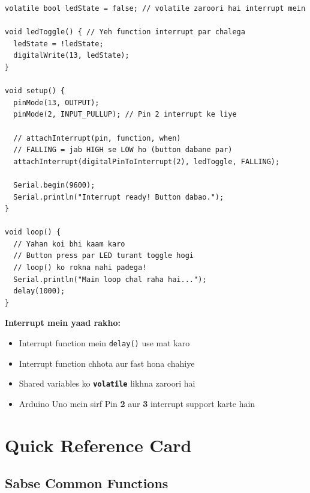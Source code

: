 \documentclass[12pt,a4paper]{article}
\newcommand{\keyword}[1]{\textcolor{keywordColor}{\texttt{\textbf{#1}}}}
\begin{document}
\begin{tcolorbox}[codebox=Example 21: Button Interrupt — Instant Response]
\begin{lstlisting}
volatile bool ledState = false; // volatile zaroori hai interrupt mein

void ledToggle() { // Yeh function interrupt par chalega
  ledState = !ledState;
  digitalWrite(13, ledState);
}

void setup() {
  pinMode(13, OUTPUT);
  pinMode(2, INPUT_PULLUP); // Pin 2 interrupt ke liye

  // attachInterrupt(pin, function, when)
  // FALLING = jab HIGH se LOW ho (button dabane par)
  attachInterrupt(digitalPinToInterrupt(2), ledToggle, FALLING);

  Serial.begin(9600);
  Serial.println("Interrupt ready! Button dabao.");
}

void loop() {
  // Yahan koi bhi kaam karo
  // Button press par LED turant toggle hogi
  // loop() ko rokna nahi padega!
  Serial.println("Main loop chal raha hai...");
  delay(1000);
}
\end{lstlisting}
\end{tcolorbox}

\begin{tcolorbox}[notebox]
\textbf{Interrupt mein yaad rakho:}
\begin{itemize}
  \item Interrupt function mein \texttt{delay()} use mat karo
  \item Interrupt function chhota aur fast hona chahiye
  \item Shared variables ko \keyword{volatile} likhna zaroori hai
  \item Arduino Uno mein sirf Pin \textbf{2} aur \textbf{3} interrupt support karte hain
\end{itemize}
\end{tcolorbox}

\newpage

\section{Quick Reference Card}

\subsection{Sabse Common Functions}
\end{document}
